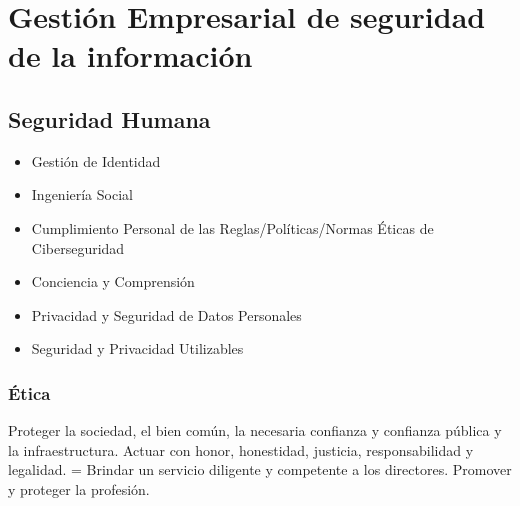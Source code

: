 \chapter{Gestión Empresarial de seguridad de la información}
\begin{flushright}
    \textit{ }
\end{flushright}





\section{Seguridad Humana}
\color{blue}
\begin{itemize}
  \item Gestión de Identidad
  \item Ingeniería Social
  \item Cumplimiento Personal de las Reglas/Políticas/Normas Éticas de Ciberseguridad
  \item Conciencia y Comprensión
  \item Privacidad y Seguridad de Datos Personales
  \item Seguridad y Privacidad Utilizables
\end{itemize}
\color{black}

\subsection{Ética}
Proteger la sociedad, el bien común, la necesaria confianza y confianza pública y la infraestructura.
Actuar con honor, honestidad, justicia, responsabilidad y legalidad. =
Brindar un servicio diligente y competente a los directores.
Promover y proteger la profesión.
















